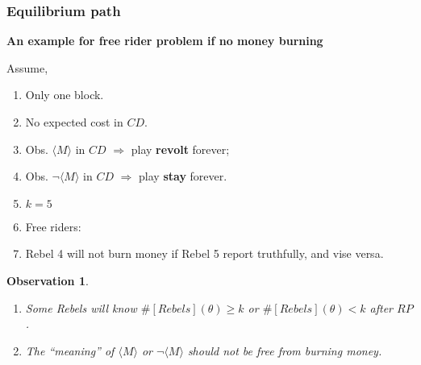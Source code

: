 \documentclass[10pt]{beamer}
\newtheorem*{observation}{Observation}
\begin{document}
\begin{frame}
\frametitle{Equilibrium path}

\textbf{An example for free rider problem if no money burning}

Assume,
\begin{enumerate}
\item Only one block.
\item No expected cost in $CD$.
\item Obs. $\langle M \rangle$ in $CD$ $\Rightarrow$ play \textbf{revolt} forever; 
\item Obs. $\neg \langle M \rangle$ in $CD$ $\Rightarrow$ play \textbf{stay} forever.
\item $k=5$
\item Free riders:
\begin{center}
\end{center}

\item Rebel 4 will not burn money if Rebel 5 report truthfully, and vise versa.

\end{enumerate}

\begin{observation}
\begin{enumerate}
\item Some Rebels \alert{will} know $\#[Rebels](\theta)\geq k$ or $\#[Rebels](\theta)< k$ after $RP$.
\item The ``meaning'' of $\langle M \rangle$ or $\neg \langle M \rangle$ should not be free from burning money.
\end{enumerate}
\end{observation}

\end{frame}
\end{document}
